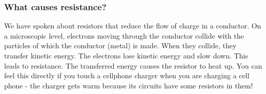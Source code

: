 	\par 


      \label{m38776*uid62}
            \subsubsection{ What causes resistance?}
            \nopagebreak
            
        
        \label{m38776*id67246}We have spoken about resistors that reduce the flow of charge
in a conductor. On a microscopic level, electrons moving through
the conductor collide with the particles of which the conductor
(metal) is made. When they collide, they transfer kinetic energy.
The electrons lose kinetic energy and slow down. This leads to
resistance. The transferred energy causes the resistor to heat up.
You can feel this directly if you touch a cellphone charger when you are charging a cell phone - the charger gets warm because its circuits have some resistors in them!\par 

